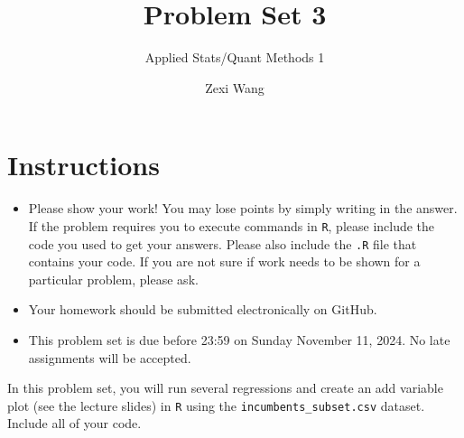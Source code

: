 \documentclass[12pt,letterpaper]{article}
\title{Problem Set 3}
\date{Zexi Wang}
\author{Applied Stats/Quant Methods 1}
\begin{document}
	\maketitle
	\section*{Instructions}
	\begin{itemize}
		\item Please show your work! You may lose points by simply writing in the answer. If the problem requires you to execute commands in \texttt{R}, please include the code you used to get your answers. Please also include the \texttt{.R} file that contains your code. If you are not sure if work needs to be shown for a particular problem, please ask.
	\item Your homework should be submitted electronically on GitHub.
	\item This problem set is due before 23:59 on Sunday November 11, 2024. No late assignments will be accepted.

	\end{itemize}

		\vspace{.25cm}
	
\noindent In this problem set, you will run several regressions and create an add variable plot (see the lecture slides) in \texttt{R} using the \texttt{incumbents\_subset.csv} dataset. Include all of your code.

	\vspace{.5cm}
\end{document}
